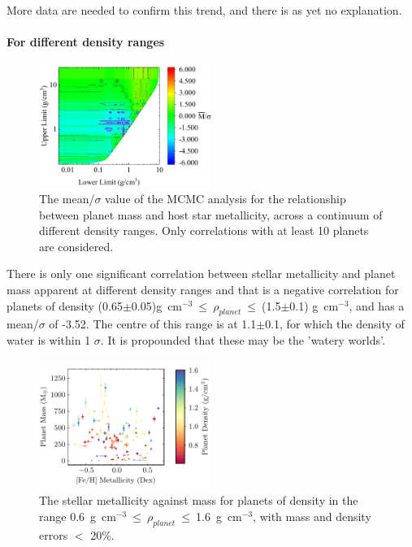 \documentclass[a4paper,twocolumn,12pt]{article}
\begin{document}
More data are needed to confirm this trend, and there is as yet no explanation. %





\paragraph{For different density ranges}
\begin{figure}[h!]
    \centering
    \includegraphics[width=0.5\textwidth]{Graphs/FeH vs Mass correlations - Density ranges.pdf}
    \caption{The mean/$\sigma$ value of the MCMC analysis for the relationship between planet mass and host star metallicity, across a continuum of different density ranges. Only correlations with at least 10 planets are considered.}
    \label{figure: Fe/H vs Mass correlations - Density ranges}
\end{figure}

There is only one significant correlation between stellar metallicity and planet mass apparent at different density ranges and that is a negative correlation for planets of density (0.65$\pm$0.05)g~cm$^{-3}~\leq~\rho_{planet}~\leq~$(1.5$\pm$0.1) g~cm$^{-3}$, and has a mean/$\sigma$ of -3.52. The centre of this range is at 1.1$\pm$0.1, for which the density of water is within 1 $\sigma$. It is propounded that these may be the 'watery worlds'.

\begin{figure}[h!]
    \centering
    \includegraphics[width=0.5\textwidth]{Graphs/FeH vs Mass Planet Plot Density 0.6 to 1.6.pdf}
    \caption{The stellar metallicity against mass for planets of density in the range 0.6~g~cm$^{-3}~\leq~\rho_{planet}~\leq~$1.6~g~cm$^{-3}$, with mass and density errors $<$ 20\%.}
    \label{figure: Fe/H vs Mass correlations - Density ranges}
\end{figure}
\end{document}
